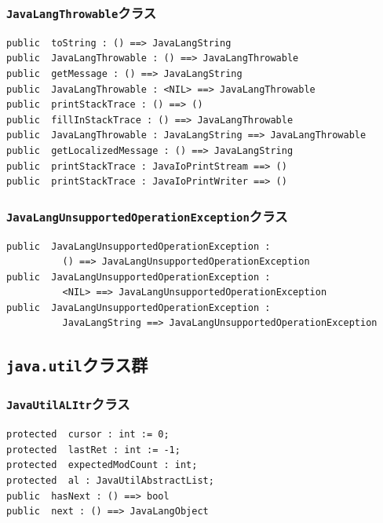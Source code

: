 \documentclass[\pformat,12pt]{jarticle}
\begin{document}
\subsubsection{\texttt{JavaLangThrowable}クラス}
\begin{small}
\begin{verbatim}
public  toString : () ==> JavaLangString
public  JavaLangThrowable : () ==> JavaLangThrowable
public  getMessage : () ==> JavaLangString
public  JavaLangThrowable : <NIL> ==> JavaLangThrowable
public  printStackTrace : () ==> ()
public  fillInStackTrace : () ==> JavaLangThrowable
public  JavaLangThrowable : JavaLangString ==> JavaLangThrowable
public  getLocalizedMessage : () ==> JavaLangString
public  printStackTrace : JavaIoPrintStream ==> ()
public  printStackTrace : JavaIoPrintWriter ==> ()
\end{verbatim}
\end{small}

\subsubsection{\texttt{JavaLangUnsupportedOperationException}クラス}
\begin{small}
\begin{verbatim}
public  JavaLangUnsupportedOperationException : 
          () ==> JavaLangUnsupportedOperationException
public  JavaLangUnsupportedOperationException : 
          <NIL> ==> JavaLangUnsupportedOperationException
public  JavaLangUnsupportedOperationException : 
          JavaLangString ==> JavaLangUnsupportedOperationException
\end{verbatim}
\end{small}

\subsection{\texttt{java.util}クラス群}

\subsubsection{\texttt{JavaUtilALItr}クラス}
\begin{small}
\begin{verbatim}
protected  cursor : int := 0;
protected  lastRet : int := -1;
protected  expectedModCount : int;
protected  al : JavaUtilAbstractList;
public  hasNext : () ==> bool
public  next : () ==> JavaLangObject
\end{verbatim}
\end{small}
\end{document}
